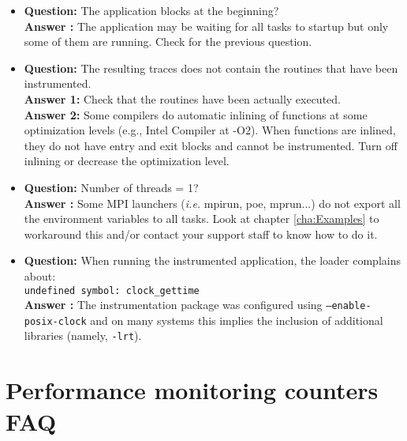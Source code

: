 \begin{itemize}
\item {\bf Question:} The application blocks at the beginning?\\
      {\bf Answer  :} The application may be waiting for all tasks to startup but only some of them are running. Check for the previous question.

\item {\bf Question:} The resulting traces does not contain the routines that have been instrumented.\\
      {\bf Answer 1:} Check that the routines have been actually executed.\\
      {\bf Answer 2:} Some compilers do automatic inlining of functions at some optimization levels (e.g., Intel Compiler at -O2). When functions are inlined, they do not have entry and exit blocks and cannot be instrumented. Turn off inlining or decrease the optimization level.

\item {\bf Question:} Number of threads = 1?\\
      {\bf Answer  :} Some MPI launchers ({\it i.e.} mpirun, poe, mprun...) do not export all the environment variables to all tasks. Look at chapter \ref{cha:Examples} to workaround this and/or contact your support staff to know how to do it.

\item {\bf Question:} When running the instrumented application, the loader complains about:\\
              {\tt undefined symbol: clock\_gettime}\\
      {\bf Answer  :} The instrumentation package was configured using {\tt --enable-posix-clock} and on many systems this implies the inclusion of additional libraries (namely, {\tt -lrt}).

\end{itemize}

\section{Performance monitoring counters FAQ}

